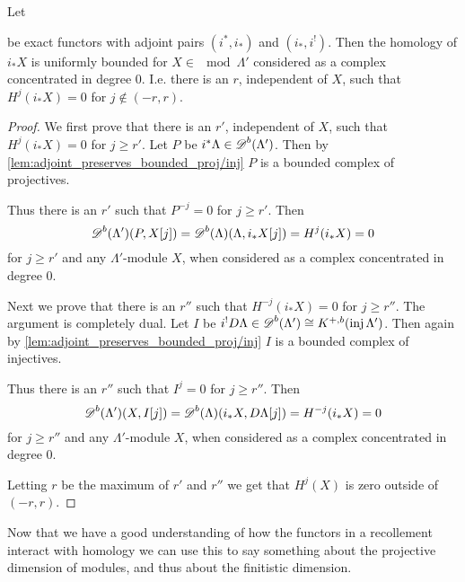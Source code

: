 \begin{lemma} \label{lem:uniform_bound_on_homology}
	Let  be exact functors with adjoint pairs $(i^*,i_*)$ and $(i_*, i^!)$. Then the homology of $i_*X$ is uniformly bounded for $X\in\mod\Lambda'$ considered as a complex concentrated in degree 0. I.e. there is an $r$, independent of $X$, such that $H^{j}(i_*X) = 0$ for $j\not\in(-r, r)$.
	\begin{proof}
		We first prove that there is an $r'$, independent of $X$, such that $H^{j}(i_*X)=0$ for $j \geq r'$.
		Let $P$ be $i^*\Lambda \in \operatorname{\mathscr{D}}^b(\Lambda')$. Then by \cref{lem:adjoint_preserves_bounded_proj/inj} $P$ is a bounded complex of projectives.
		
		Thus there is an $r'$ such that $P^{-j}=0$ for $j \geq r'$. Then $$\operatorname{\mathscr{D}}^b(\Lambda')(P, X[j]) = \operatorname{\mathscr{D}}^b(\Lambda)(\Lambda, i_*X[j]) = H^{j}(i_*X)=0$$ for $j\geq r'$ and any $\Lambda'$-module $X$, when considered as a complex concentrated in degree 0.
		
		Next we prove that there is an $r''$ such that $H^{-j}(i_*X)=0$ for $j \geq r''$. The argument is completely dual. Let $I$ be $i^!D\Lambda \in \operatorname{\mathscr{D}}^b(\Lambda') \cong K^{+,b}(\operatorname{inj}\Lambda')$. Then again by \cref{lem:adjoint_preserves_bounded_proj/inj} $I$ is a bounded complex of injectives.
		
		Thus there is an $r''$ such that $I^{j}=0$ for $j \geq r''$. Then $$\operatorname{\mathscr{D}}^b(\Lambda')(X, I[j]) = \operatorname{\mathscr{D}}^b(\Lambda)(i_*X, D\Lambda[j]) = H^{-j}(i_*X)=0$$ for $j\geq r''$ and any $\Lambda'$-module $X$, when considered as a complex concentrated in degree 0.
		
		Letting $r$ be the maximum of $r'$ and $r''$ we get that $H^{j}(X)$ is zero outside of $(-r, r)$.
	\end{proof}
\end{lemma}

Now that we have a good understanding of how the functors in a recollement interact with homology we can use this to say something about the projective dimension of modules, and thus about the finitistic dimension.

